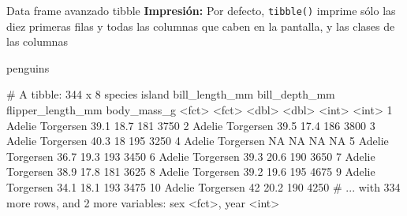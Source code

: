 \documentclass[
  ignorenonframetext,
  aspectratio=169]{beamer}
\newenvironment{Shaded}{\begin{snugshade}}{\end{snugshade}}
\newcommand{\NormalTok}[1]{#1}
\let\oldverbatim\verbatim
\let\endoldverbatim\endverbatim
\renewenvironment{verbatim}{\tiny\oldverbatim}{\endoldverbatim}
\begin{document}
\begin{frame}[fragile]{Data frame avanzado tibble}
\protect\hypertarget{data-frame-avanzado-tibble-5}{}
\textbf{Impresión:} Por defecto, \texttt{tibble()} imprime sólo las diez
primeras filas y todas las columnas que caben en la pantalla, y las
clases de las columnas

\begin{Shaded}
\begin{Highlighting}[]
\NormalTok{penguins}
\end{Highlighting}
\end{Shaded}

\begin{verbatim}
# A tibble: 344 x 8
   species island    bill_length_mm bill_depth_mm flipper_length_mm body_mass_g
   <fct>   <fct>              <dbl>         <dbl>             <int>       <int>
 1 Adelie  Torgersen           39.1          18.7               181        3750
 2 Adelie  Torgersen           39.5          17.4               186        3800
 3 Adelie  Torgersen           40.3          18                 195        3250
 4 Adelie  Torgersen           NA            NA                  NA          NA
 5 Adelie  Torgersen           36.7          19.3               193        3450
 6 Adelie  Torgersen           39.3          20.6               190        3650
 7 Adelie  Torgersen           38.9          17.8               181        3625
 8 Adelie  Torgersen           39.2          19.6               195        4675
 9 Adelie  Torgersen           34.1          18.1               193        3475
10 Adelie  Torgersen           42            20.2               190        4250
# ... with 334 more rows, and 2 more variables: sex <fct>, year <int>
\end{verbatim}
\end{frame}
\end{document}
